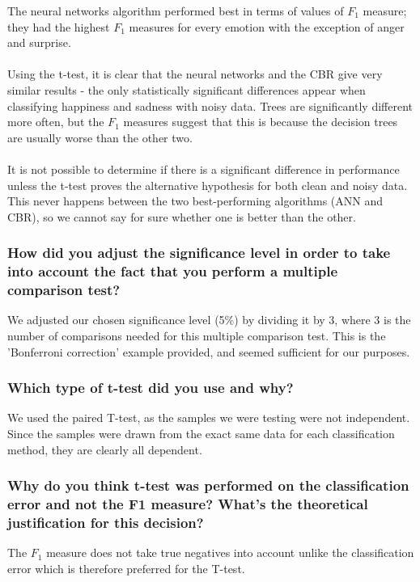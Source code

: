 \documentclass[12pt]{article}
\begin{document}
The neural networks algorithm performed best in terms of values of $F_1$ measure; they had the highest $F_1$ measures for every emotion with the exception of anger and surprise. \\ \\
Using the t-test, it is clear that the neural networks and the CBR give very similar results - the only statistically significant differences appear when classifying happiness and sadness with noisy data. Trees are significantly different more often, but the $F_1$ measures suggest that this is because the decision trees are usually worse than the other two. \\ \\
It is not possible to determine if there is a significant difference in performance unless the t-test proves the alternative hypothesis for both clean and noisy data. This never happens between the two best-performing algorithms (ANN and CBR), so we cannot say for sure whether one is better than the other.

\subsubsection*{How did you adjust the significance level in order to take into account the fact that you perform a multiple comparison test?}

We adjusted our chosen significance level (5\%) by dividing it by 3, where 3 is the number of comparisons needed for this multiple comparison test. This is the 'Bonferroni correction' example provided, and seemed sufficient for our purposes.

\subsubsection*{Which type of t-test did you use and why?}

We used the paired T-test, as the samples we were testing were not independent. Since the samples were drawn from the exact same data for each classification method, they are clearly all dependent.

\subsubsection*{Why do you think t-test was performed on the classification error and not the F1 measure? What's the theoretical justification for this decision?}

The $F_1$ measure does not take true negatives into account unlike the classification error which is therefore preferred for the T-test.
\end{document}
